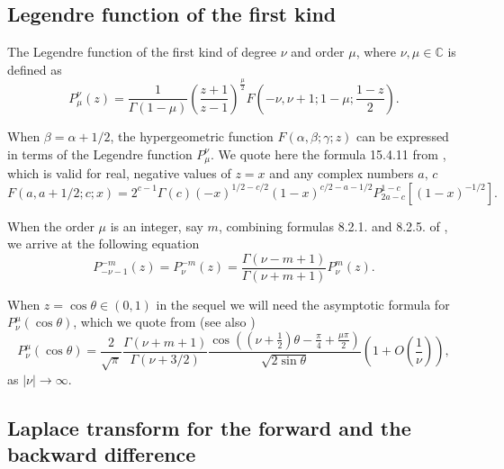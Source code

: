 \documentclass[12pt]{amsart}
\numberwithin{equation}{section}
\begin{document}
\subsection{Legendre function of the first kind}

The Legendre function of the first kind of degree $\nu$ and order $\mu$, where $\nu,\mu\in\mathbb{C}$ is defined as
$$
P_{\mu}^{\nu}(z)= \frac{1}{\Gamma(1-\mu)}\left(\frac{z+1}{z-1}\right)^{\frac{\mu}{2}} F\left(-\nu,\nu+1;1-\mu;\frac{1-z}{2}\right).
$$

When $\beta=\alpha+1/2$, the hypergeometric function $F(\alpha,\beta;\gamma;z)$ can be expressed in terms of the Legendre function $P_{\mu}^{\nu}$. We quote here the formula 15.4.11 from \cite{AS}, which is valid for real, negative values of $z=x$ and any complex numbers $a,\,c$
\begin{equation}\label{eq. hypergeom = Leg}
F(a,a+1/2;c;x) = 2^{c-1}\Gamma(c)(-x)^{1/2-c/2} (1-x)^{c/2-a-1/2} P_{2a-c}^{1-c}\left[(1-x)^{-1/2}\right].
\end{equation}

When the order $\mu$ is an integer, say $m$, combining formulas 8.2.1. and 8.2.5. of \cite{AS}, we arrive at the following equation
\begin{equation}\label{eq. Leg at negatives}
  P_{-\nu-1}^{-m}(z)=P_{\nu}^{-m}(z)=\frac{\Gamma(\nu-m+1)}{\Gamma(\nu+m+1)}P_{\nu}^m(z).
\end{equation}

When $z=\cos\theta \in(0,1)$ in the sequel we will need the asymptotic formula for $P_{\nu}^{\mu}(\cos \theta)$, which we quote from \cite[formula 8.721.3]{GR} (see also \cite{Th})
\begin{equation}\label{eq. Leg asymptotics}
  P_{\nu}^{\mu}(\cos \theta)=\frac{2}{\sqrt{\pi}}\frac{\Gamma(\nu+m+1)}{\Gamma(\nu+3/2)}\frac{\cos\left( \left(\nu+\frac{1}{2}\right)\theta - \frac{\pi}{4} + \frac{\mu \pi}{2} \right)}{\sqrt{2 \sin \theta}}\left(1+O\left(\frac{1}{\nu}\right)\right),
\end{equation}
as $|\nu| \to\infty$.

\subsection{Laplace transform for the forward and the backward difference}\label{sec. Laplace transf}
\end{document}
